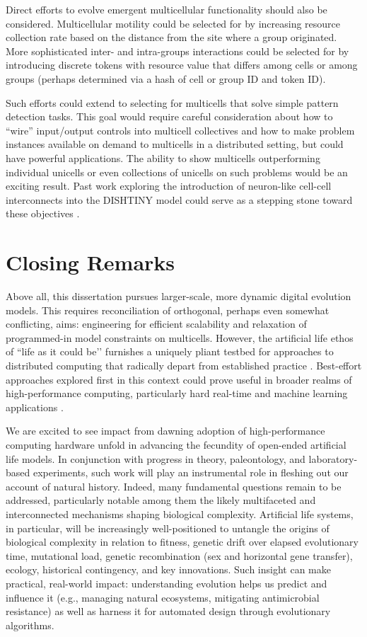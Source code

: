 Direct efforts to evolve emergent multicellular functionality should also be considered.
Multicellular motility could be selected for by increasing resource collection rate based on the distance from the site where a group originated.
More sophisticated inter- and intra-groups interactions could be selected for by introducing discrete tokens with resource value that differs among cells or among groups (perhaps determined via a hash of cell or group ID and token ID).

Such efforts could extend to selecting for multicells that solve simple pattern detection tasks.
This goal would require careful consideration about how to ``wire'' input/output controls into multicell collectives and how to make problem instances available on demand to multicells in a distributed setting, but could have powerful applications.
The ability to show multicells outperforming individual unicells or even collections of unicells on such problems would be an exciting result.
Past work exploring the introduction of neuron-like cell-cell interconnects into the DISHTINY model could serve as a stepping stone toward these objectives \citep{moreno2020practical}.

\section{Closing Remarks}

Above all, this dissertation pursues larger-scale, more dynamic digital evolution models.
This requires reconciliation of orthogonal, perhaps even somewhat conflicting, aims: engineering for efficient scalability and relaxation of programmed-in model constraints on multicells.
However, the artificial life ethos of ``life as it could be’’ furnishes a uniquely pliant testbed for approaches to distributed computing that radically depart from established practice \citep{forbes2000life}.
Best-effort approaches explored first in this context could prove useful in broader realms of high-performance computing, particularly hard real-time and machine learning applications  \citep{rhodes2020real}.

We are excited to see impact from dawning adoption of high-performance computing hardware unfold in advancing the fecundity of open-ended artificial life models.
In conjunction with progress in theory, paleontology, and laboratory-based experiments, such work will play an instrumental role in fleshing out our account of natural history.
Indeed, many fundamental questions remain to be addressed, particularly notable among them the likely multifaceted and interconnected mechanisms shaping biological complexity.
Artificial life systems, in particular, will be increasingly well-positioned to untangle the origins of biological complexity in relation to fitness, genetic drift over elapsed evolutionary time, mutational load, genetic recombination (sex and horizontal gene transfer), ecology, historical contingency, and key innovations.
Such insight can make practical, real-world impact: understanding evolution helps us predict and influence it (e.g., managing natural ecosystems, mitigating antimicrobial resistance) as well as harness it for automated design through evolutionary algorithms.

